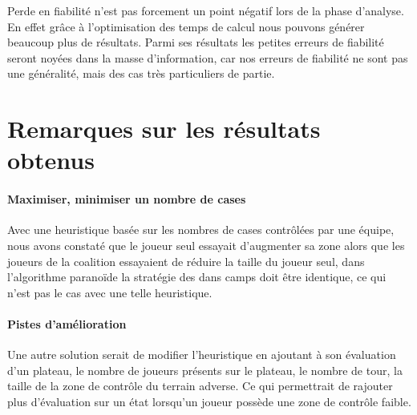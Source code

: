 \begin{info}
	Perde en fiabilité n'est pas forcement un point négatif lors de
	la phase d'analyse. En effet grâce à l'optimisation des temps de calcul nous
	pouvons générer beaucoup plus de résultats. Parmi ses résultats les petites
	erreurs de fiabilité seront noyées dans la masse d'information, car nos
	erreurs de fiabilité ne sont pas une généralité, mais des cas très
	particuliers de partie.
\end{info}


\section{Remarques sur les résultats obtenus}

\paragraph{Maximiser, minimiser un nombre de cases}

Avec une heuristique basée sur les nombres de cases contrôlées par une
équipe, nous avons constaté que le joueur seul essayait d'augmenter sa zone
alors que les joueurs de la coalition essayaient de réduire la taille du 
joueur seul, dans l'algorithme paranoïde la stratégie des dans camps doit
être identique, ce qui n'est pas le cas avec une telle heuristique.


\paragraph{Pistes d'amélioration}
Une autre solution serait de modifier l'heuristique en ajoutant à son 
évaluation d'un plateau, le nombre de joueurs présents sur le plateau, le
nombre de tour, la taille de la zone de contrôle du terrain adverse. Ce qui
permettrait de rajouter plus d'évaluation sur un état lorsqu'un joueur
possède une zone de contrôle faible.